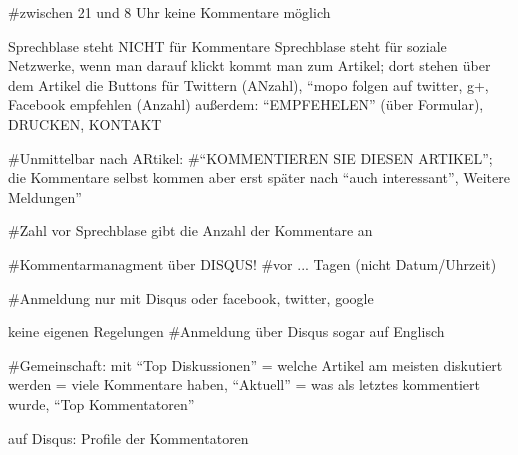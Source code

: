 #zwischen 21 und 8 Uhr keine Kommentare möglich

Sprechblase steht NICHT für Kommentare
Sprechblase steht  für soziale Netzwerke, wenn man darauf klickt kommt man zum Artikel; dort stehen über dem Artikel die Buttons für Twittern (ANzahl), ``mopo folgen auf twitter, g+,  Facebook empfehlen (Anzahl) 
außerdem: ``EMPFEHELEN'' (über Formular), DRUCKEN, KONTAKT

#Unmittelbar nach ARtikel:
#``KOMMENTIEREN SIE DIESEN ARTIKEL''; die Kommentare selbst kommen aber erst später nach ``auch interessant'', Weitere Meldungen''

#Zahl vor Sprechblase gibt die Anzahl der Kommentare an 

#Kommentarmanagment über DISQUS!
#vor ... Tagen (nicht Datum/Uhrzeit)

#Anmeldung nur mit Disqus oder facebook, twitter, google

keine eigenen Regelungen
#Anmeldung über Disqus sogar auf Englisch

#Gemeinschaft: mit ``Top Diskussionen'' = welche Artikel am meisten diskutiert werden = viele Kommentare haben, ``Aktuell''  = was als letztes kommentiert wurde, ``Top Kommentatoren''

auf Disqus: Profile der Kommentatoren
